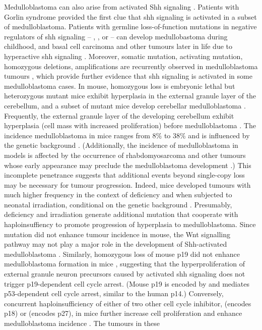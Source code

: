 Medulloblastoma can also arise from activated Shh signaling . Patients with Gorlin syndrome provided the first clue that \gls{shh} signaling is activated in a subset of medulloblastoma. Patients with germline loss-of-function mutations in negative regulators of \gls{shh} signaling -- , , or  -- can develop medullobastoma during childhood, and basal cell carcinoma and other tumours later in life due to hyperactive \gls{shh} signaling . Moreover, somatic  mutation, activating  mutation,  homozygous deletions,  amplifications are recurrently observed in medulloblastoma tumours , which provide further evidence that \gls{shh} signaling is activated in some medulloblastoma cases. In mouse, homozygous  loss is embryonic lethal but heterozygous  mutant mice exhibit hyperplasia in the external granule layer of the cerebellum, and a subset of mutant mice develop cerebellar medulloblastoma . Frequently, the external granule layer of the developing cerebellum exhibit hyperplasia (cell mass with increased proliferation) before medulloblastoma . The incidence medulloblastoma in \high{+/-} mice ranges from 8\% to 38\% and is influenced by the genetic background . (Additionally, the incidence of medulloblastoma in \high{+/-} models is affected by the occurrence of rhabdomyosarcoma and other tumours whose early appearance may preclude the medulloblastoma development .) This incomplete penetrance suggests that additional events beyond single-copy  loss may be necessary for tumour progression. Indeed, \high{+/-} mice developed tumours with much higher frequency in the context of  deficiency  and when subjected to neonatal irradiation, conditional on the genetic background . Presumably,  deficiency and irradiation generate additional mutation that cooperate with  haploinsuffiency to promote progression of hyperplasia to medulloblastoma. Since  mutation did not enhance tumour incidence in \high{+/-} mouse, the Wnt signalling pathway may not play a major role in the development of Shh-activated medulloblastoma . Similarly, homozygous loss of mouse p19 did not enhance medulloblastoma formation in \high{+/-} mice , suggesting that the hyperproliferation of external granule neuron precursors caused by activated \gls{shh} signaling does not trigger p19-dependent cell cycle arrest. (Mouse p19 is encoded by  and mediates p53-dependent cell cycle arrest, similar to the human p14.) Conversely, concurrent haploinsufficiency of either of two other cell cycle inhibitor,  (encodes p18) or  (encodes p27), in  mice further increase cell proliferation and enhance medulloblastoma incidence . The tumours in these 